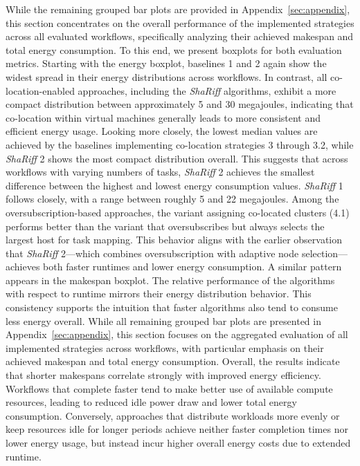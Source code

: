 While the remaining grouped bar plots are provided in Appendix~\ref{sec:appendix}, this section concentrates on the overall performance of the implemented strategies across all evaluated workflows, specifically analyzing their achieved makespan and total energy consumption. To this end, we present boxplots for both evaluation metrics.
Starting with the energy boxplot, baselines 1 and 2 again show the widest spread in their energy distributions across workflows. In contrast, all co-location-enabled approaches, including the \textit{ShaRiff} algorithms, exhibit a more compact distribution between approximately 5 and 30 megajoules, indicating that co-location within virtual machines generally leads to more consistent and efficient energy usage. Looking more closely, the lowest median values are achieved by the baselines implementing co-location strategies 3 through 3.2, while \textit{ShaRiff} 2 shows the most compact distribution overall. This suggests that across workflows with varying numbers of tasks, \textit{ShaRiff} 2 achieves the smallest difference between the highest and lowest energy consumption values. \textit{ShaRiff} 1 follows closely, with a range between roughly 5 and 22 megajoules. Among the oversubscription-based approaches, the variant assigning co-located clusters (4.1) performs better than the variant that oversubscribes but always selects the largest host for task mapping. This behavior aligns with the earlier observation that \textit{ShaRiff} 2—which combines oversubscription with adaptive node selection—achieves both faster runtimes and lower energy consumption.
A similar pattern appears in the makespan boxplot. The relative performance of the algorithms with respect to runtime mirrors their energy distribution behavior. This consistency supports the intuition that faster algorithms also tend to consume less energy overall. While all remaining grouped bar plots are presented in Appendix~\ref{sec:appendix}, this section focuses on the aggregated evaluation of all implemented strategies across workflows, with particular emphasis on their achieved makespan and total energy consumption.
Overall, the results indicate that shorter makespans correlate strongly with improved energy efficiency. Workflows that complete faster tend to make better use of available compute resources, leading to reduced idle power draw and lower total energy consumption. Conversely, approaches that distribute workloads more evenly or keep resources idle for longer periods achieve neither faster completion times nor lower energy usage, but instead incur higher overall energy costs due to extended runtime.
